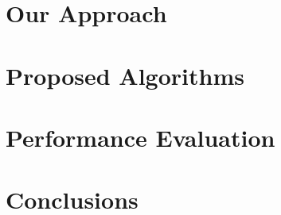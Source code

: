 \documentclass[prodmode,acmtecs]{acmsmall}
\begin{document}
\section{Our Approach}


\section{Proposed Algorithms}


\section{Performance Evaluation}


\section{Conclusions}







%

\end{document}
